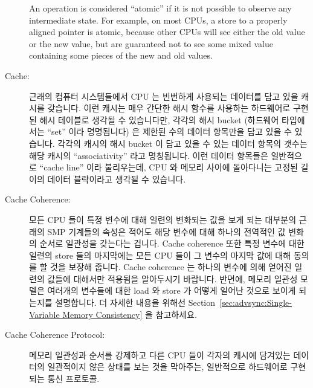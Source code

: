 \begin{description}
	An operation is considered ``atomic'' if it is not possible to
	observe any intermediate state.
	For example, on most CPUs, a store to a properly aligned pointer
	is atomic, because other CPUs will see either the old value or
	the new value, but are guaranteed not to see some mixed value
	containing some pieces of the new and old values.
	\fi
\item[Cache:]
	근래의 컴퓨터 시스템들에서 CPU 는 빈번하게 사용되는 데이터를 담고 있을
	캐시를 갖습니다.
	이런 캐시는 매우 간단한 해시 함수를 사용하는 하드웨어로 구현된 해시
	테이블로 생각될 수 있습니다만, 각각의 해시 bucket (하드웨어 타입에서는
	``set'' 이라 명명됩니다) 은 제한된 수의 데이터 항목만을 담고 있을 수
	있습니다.
	각각의 캐시의 해시 bucket 이 담고 있을 수 있는 데이터 항목의 갯수는
	해당 캐시의 ``associativity'' 라고 명칭됩니다.
	이런 데이터 항목들은 일반적으로 ``cache line'' 이라 불리우는데, CPU 와
	메모리 사이에 돌아다니는 고정된 길이의 데이터 블락이라고 생각될 수
	있습니다.
	\iffalse

	In modern computer systems, CPUs have caches in which to hold
	frequently used data.
	These caches can be thought of as hardware hash tables with very
	simple hash functions,
	but in which each hash bucket (termed a ``set'' by hardware types)
	can hold only a limited number of data items.
	The number of data items that can be held by each of a cache's hash
	buckets is termed the cache's ``associativity''.
	These data items are normally called ``cache lines'', which
	can be thought of a fixed-length blocks of data that circulate
	among the CPUs and memory.
	\fi
\item[Cache Coherence:]
	모든 CPU 들이 특정 변수에 대해 일련의 변화되는 값을 보게 되는 대부분의
	근래의 SMP 기계들의 속성은 적어도 해당 변수에 대해 하나의 전역적인 값
	변화의 순서로 일관성을 갖는다는 겁니다.
	Cache coherence 또한 특정 변수에 대한 일련의 store 들의 마지막에는 모든
	CPU 들이 그 변수의 마지막 값에 대해 동의를 할 것을 보장해 줍니다.
	Cache coherence 는 하나의 변수에 의해 얻어진 일련의 값들에 대해서만
	적용됨을 알아두시기 바랍니다.
	반면에, 메모리 일관성 모델은 여러개의 변수들에 대한 load 와 store 가
	어떻게 일어난 것으로 보이게 되는지를 설명합니다.
	더 자세한 내용을 위해선
	Section~\ref{sec:advsync:Single-Variable Memory Consistency} 을
	참고하세요.
	\iffalse

	A property of most modern SMP machines where all CPUs will
	observe a sequence of values for a given variable that is
	consistent with at least one global order of values for
	that variable.
	Cache coherence also guarantees that at the end of a group
	of stores to a given variable, all CPUs will agree
	on the final value for that variable.
	Note that cache coherence applies only to the series of values
	taken on by a single variable.
	In contrast, the memory consistency model for a given machine
	describes the order in which loads and stores to groups of
	variables will appear to occur.
	See Section~\ref{sec:advsync:Single-Variable Memory Consistency}
	for more information.
	\fi
\item[Cache Coherence Protocol:]
	메모리 일관성과 순서를 강제하고 다른 CPU 들이 각자의 캐시에 담겨있는
	데이터의 일관적이지 않은 상태를 보는 것을 막아주는, 일반적으로
	하드웨어로 구현되는 통신 프로토콜.
	\iffalse


\end{description}
